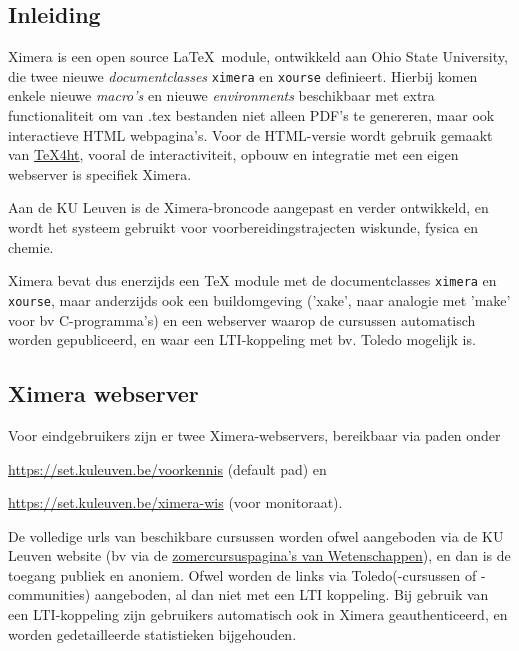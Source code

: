 \documentclass{ximera}
\begin{document}
    \author{Wim Obbels}
    \label{xim:ximeraSchema}

    
\subsection{Inleiding}

Ximera is een open source \LaTeX\  module, ontwikkeld aan Ohio State University, die twee nieuwe \textit{documentclasses} \verb|ximera| en \verb|xourse| definieert.
Hierbij komen enkele nieuwe \textit{macro's} en nieuwe \textit{environments} beschikbaar met extra functionaliteit om van .tex bestanden niet alleen PDF's te genereren, maar ook interactieve HTML webpagina's. Voor de HTML-versie wordt gebruik gemaakt van \href{https://tug.org/tex4ht/}{TeX4ht}, vooral de interactiviteit, opbouw en integratie met een eigen webserver is specifiek Ximera.

Aan de KU Leuven is de Ximera-broncode aangepast en verder ontwikkeld, en wordt het systeem gebruikt voor voorbereidingstrajecten wiskunde, fysica en chemie.

Ximera bevat dus enerzijds een TeX module met de documentclasses \verb|ximera| en \verb|xourse|, maar anderzijds ook een buildomgeving ('xake', naar analogie met 'make' voor bv C-programma's) en een webserver waarop de cursussen automatisch worden gepubliceerd, en waar een LTI-koppeling met bv. Toledo mogelijk is.

\subsection{Ximera webserver}

Voor eindgebruikers zijn er twee Ximera-webservers, bereikbaar via paden onder

\url{https://set.kuleuven.be/voorkennis} (default pad) en

\url{https://set.kuleuven.be/ximera-wis} (voor monitoraat).

De volledige urls van beschikbare cursussen worden ofwel aangeboden via de KU Leuven website (bv via de \href{https://wet.kuleuven.be/schoolverlater/basiswiskunde}{zomercursuspagina's van Wetenschappen}), en dan is de toegang publiek en anoniem. 
Ofwel worden de links via Toledo(-cursussen of -communities) aangeboden, al dan niet met een LTI koppeling. Bij gebruik van een LTI-koppeling zijn gebruikers automatisch ook in Ximera geauthenticeerd, en worden gedetailleerde statistieken bijgehouden.
\end{document}
